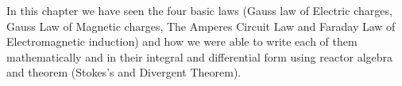 In this chapter we have seen the four basic laws (Gauss law of Electric charges, Gauss Law of Magnetic charges, The Amperes Circuit Law and Faraday Law of Electromagnetic induction) and how we were able to write each of them mathematically and in their integral and differential form using reactor algebra and theorem (Stokes's and Divergent Theorem).